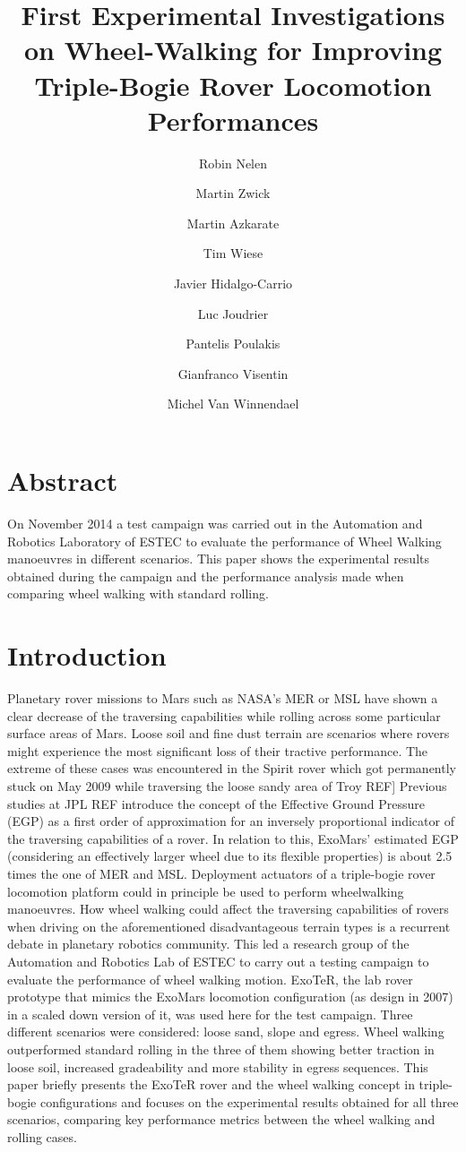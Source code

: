 \documentclass[a4paper,twocolumn]{esapub2005} %
\title{First Experimental Investigations on Wheel-Walking for Improving Triple-Bogie Rover Locomotion Performances}
\author{Robin Nelen}
\author{Martin Zwick}
\author{Martin Azkarate}
\author{Tim Wiese}
\author{Javier Hidalgo-Carrio}
\author{Luc Joudrier}
\author{Pantelis Poulakis}
\author{Gianfranco Visentin}
\author{Michel Van Winnendael}
\affil{European Space Agency, ESA, Noordwijk, The Netherlands}
\affil{Technische Universit\"at M\"unchen, TUM, Munich, Germany}
\affil{Robotics Innovation Center, DFKI, Bremen, Germany}
\begin{document}

\maketitle

\section*{Abstract}
On November 2014 a test campaign was carried out in the Automation and Robotics
Laboratory of ESTEC to evaluate the performance of Wheel Walking manoeuvres in
different scenarios. This paper shows the experimental results obtained during
the campaign and the performance analysis made when comparing wheel walking
with standard rolling.


\section{Introduction}
Planetary rover missions to Mars such as NASA’s MER or MSL have shown a clear
decrease of the traversing capabilities while rolling across some particular
surface areas of Mars. Loose soil and fine dust terrain are scenarios where
rovers might experience the most significant loss of their tractive
performance. The extreme of these cases was encountered in the Spirit rover
which got permanently stuck on May 2009 while traversing the loose sandy area
of Troy REF] Previous studies at JPL REF introduce the concept of the Effective
Ground Pressure (EGP) as a first order of approximation for an inversely
proportional indicator of the traversing capabilities of a rover. In relation
to this, ExoMars’ estimated EGP (considering an effectively larger wheel due to
its flexible properties) is about 2.5 times the one of MER and MSL.  Deployment
actuators of a triple-bogie rover locomotion platform could in principle be
used to perform wheelwalking manoeuvres.  How wheel walking could affect the
traversing capabilities of rovers when driving on the aforementioned
disadvantageous terrain types is a recurrent debate in planetary robotics
community.  This led a research group of the Automation and Robotics Lab of
ESTEC to carry out a testing campaign to evaluate the performance of wheel
walking motion. ExoTeR, the lab rover prototype that mimics the ExoMars
locomotion configuration (as design in 2007) in a scaled down version of it,
was used here for the test campaign. Three different scenarios were considered:
loose sand, slope and egress. Wheel walking outperformed standard rolling in
the three of them showing better traction in loose soil, increased gradeability
and more stability in egress sequences.  This paper briefly presents the ExoTeR
rover and the wheel walking concept in triple-bogie configurations and focuses
on the experimental results obtained for all three scenarios, comparing key
performance metrics between the wheel walking and rolling cases.
\end{document}
